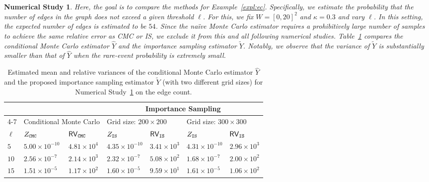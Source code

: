 \documentclass[pdflatex, sn-mathphys-ay]{sn-jnl}%
\newcommand{\wt}{\widetilde}
\newcommand{\wh}{\widehat}
\newtheorem{experiment}{Numerical Study}
\theoremstyle{thmstyleone}%
\theoremstyle{thmstyletwo}%
\theoremstyle{thmstylethree}%
\begin{document}
\begin{experiment}
\label{exper-2}
\normalfont
Here, the goal is to compare the methods for Example~\ref{expl:ec}. Specifically, we estimate the probability that the number of edges in the graph does not exceed a given threshold $\ell$.
For this, we fix $W = [0,20]^2$ and $\kappa = 0.3$ and  vary $\ell$. 
In this setting, the expected number of edges is estimated to be $54$. Since the naïve Monte Carlo estimator requires a prohibitively large number of samples to achieve the same relative error as CMC or IS, we exclude it from this and all following numerical studies. Table~\ref{tab:relVar_ISMC_CMC} compares the conditional Monte Carlo estimator $\widehat{Y}$ and the importance sampling estimator $\widetilde{Y}$. Notably, we observe that the variance of $\widetilde{Y}$ is substantially smaller than that of $\widehat{Y}$ when the rare-event probability is extremely small.
\end{experiment}

\begin{table}[h]
\caption{ Estimated mean and relative variances of the conditional Monte Carlo estimator $\wh Y$ and the proposed importance sampling estimator $\wt Y$ (with two different grid sizes) for Numerical Study~\ref{exper-2} on the edge count.}
\label{tab:relVar_ISMC_CMC}
\centering
\small
\begin{tabular}{@{}lllllll@{}}
    \hline
	  & \multicolumn{2}{l}{}
            & \multicolumn{4}{c}{Importance Sampling}\\
    \cmidrule{4-7}
	  & \multicolumn{2}{l}{Conditional Monte Carlo}
            & \multicolumn{2}{l}{Grid size: $200 \times 200$}
                    & \multicolumn{2}{l}{Grid size: $300 \times 300$}\\
    \hline 
     $\ell$          &  $Z_{\tt CMC}$  &  ${\sf RV}_{\tt CMC}$   &   $Z_{\tt IS}$  &  ${\sf RV}_{\tt IS}$  &   $Z_{\tt IS}$  &  ${\sf RV}_{\tt IS}$       \\  
    \hline
$5$   &   $5.00\times 10^{-10}$  &   $4.81\times 10^{4}$  &  $4.35\times 10^{-10}$  &   $3.41\times 10^{3}$ &   $4.31\times 10^{-10}$  &   $2.96\times 10^{3}$    \\
    \hline
$10$   &   $2.56\times 10^{-7}$  &   $2.14\times 10^{3}$  &   $2.32\times 10^{-7}$  &   $5.08\times 10^{2}$  &   $1.68\times 10^{-7}$  &   $2.00\times 10^{2}$      \\
    \hline
$15$  &   $1.51\times 10^{-5}$  &   $1.17\times 10^{2}$  &   $1.60\times 10^{-5}$  &   $9.59\times 10^{1}$  &   $1.61\times 10^{-5}$  &   $1.06\times 10^{2}$      \\
    \hline
\end{tabular}
\end{table}
\end{document}
